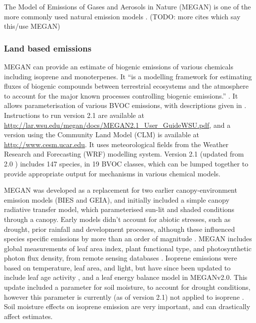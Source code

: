       The Model of Emissions of Gases and Aerosols in Nature (MEGAN) is one of the more commonly used natural emission models \citep{Monks2015}. (TODO: more cites which say this/use MEGAN)
      
    \subsubsection{Land based emissions} %
      
      MEGAN can provide an estimate of biogenic emissions of various chemicals including isoprene and monoterpenes.
      It ``is a modelling framework for estimating fluxes of biogenic compounds between terrestrial ecosystems and the atmosphere to account for the major known processes controlling biogenic emissions.'' \citep{Guenther2012}.
      It allows parameterisation of various BVOC emissions, with descriptions given in \cite{Guenther2012}.
      Instructions to run version 2.1 are available at \url{http://lar.wsu.edu/megan/docs/MEGAN2.1_User_GuideWSU.pdf}, and a version using the Community Land Model (CLM) is available at \url{http://www.cesm.ucar.edu}.
      It uses meteorological fields from the Weather Research and Forecasting (WRF) modelling system.
      Version 2.1 (updated from 2.0 \citep{Guenther2006}) includes 147 species, in 19 BVOC classes, which can be lumped together to provide appropriate output for mechanisms in various chemical models.
      
      MEGAN was developed as a replacement for two earlier canopy-environment emission models (BIES and GEIA), and initially included a simple canopy radiative transfer model, which parameterised sun-lit and shaded conditions through a canopy.
      Early models didn't account for abiotic stresses, such as drought, prior rainfall and development processes, although these influenced species specific emissions by more than an order of magnitude \citep{Niinemets1999}.
      MEGAN includes global measurements of leaf area index, plant functional type, and photosynthetic photon flux density, from remote sensing databases \citep{Kefauver2014}.
      Isoprene emissions were based on temperature, leaf area, and light, but have since been updated to include leaf age activity \citep{Guenther2000}, and a leaf energy balance model \citep{Guenther2006} in MEGANv2.0.
      This update included a parameter for soil moisture, to account for drought conditions, however this parameter is currently (as of version 2.1) not applied to isoprene \citep{Sindelarova2014}.
      Soil moisture effects on isoprene emission are very important, and can drastically affect estimates.
      
